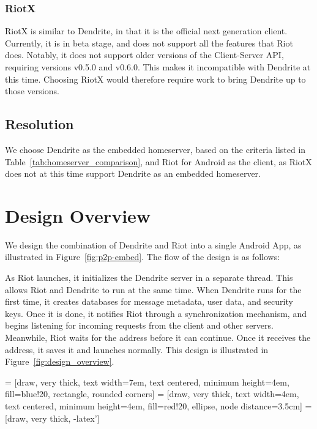 \subsubsection{RiotX}
RiotX is similar to Dendrite, in that it is the official next generation client.
Currently, it is in beta stage, and does not support all the features that Riot does.
Notably, it does not support older versions of the Client-Server API, requiring versions v0.5.0 and v0.6.0.
This makes it incompatible with Dendrite at this time.
Choosing RiotX would therefore require work to bring Dendrite up to those versions.

\subsection{Resolution}
We choose Dendrite as the embedded homeserver, based on the criteria listed in Table~\ref{tab:homeserver_comparison}, and Riot for Android as the client, as RiotX does not at this time support Dendrite as an embedded homeserver.

\section{Design Overview}
We design the combination of Dendrite and Riot into a single Android App, as illustrated in Figure~\ref{fig:p2p-embed}.
The flow of the design is as follows:

As Riot launches, it initializes the Dendrite server in a separate thread.
This allows Riot and Dendrite to run at the same time.
When Dendrite runs for the first time, it creates databases for message metadata, user data, and security keys.
Once it is done, it notifies Riot through a synchronization mechanism, and begins listening for incoming requests from the client and other servers.
Meanwhile, Riot waits for the address before it can continue.
Once it receives the address, it saves it and launches normally.
This design is illustrated in Figure~\ref{fig:design_overview}.

 = [draw, very thick, text width=7em, text centered, minimum height=4em, fill=blue!20, rectangle, rounded corners]
 = [draw, very thick, text width=4em, text centered, minimum height=4em, fill=red!20, ellipse, node distance=3.5cm]
  = [draw, very thick, -latex']

